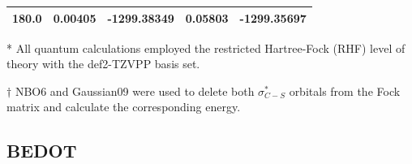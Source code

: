 \begin{table}[hbt!]
\begin{threeparttable}
\begin{tabular}{ccccc}
180.0 & 0.00405 & -1299.38349 & 0.05803 & -1299.35697 \\ \bottomrule
\end{tabular}
\begin{tablenotes}
\item[*] \footnotesize All quantum calculations employed the restricted Hartree-Fock (RHF) level of theory with the def2-TZVPP basis set.
\item[$\dagger$] \footnotesize NBO6 and Gaussian09 were used to delete both $\sigma^{*}_{C-S}$ orbitals from the Fock matrix and calculate the corresponding energy.
\end{tablenotes}
\end{threeparttable}
\end{table}

\clearpage
\subsection{BEDOT}

